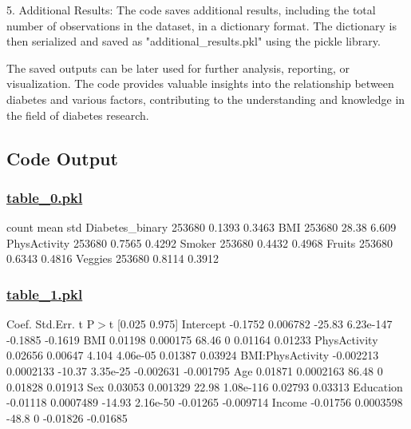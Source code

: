 \documentclass[11pt]{article}
\begin{document}
5. Additional Results: The code saves additional results, including the total number of observations in the dataset, in a dictionary format. The dictionary is then serialized and saved as "additional\_results.pkl" using the pickle library.

The saved outputs can be later used for further analysis, reporting, or visualization. The code provides valuable insights into the relationship between diabetes and various factors, contributing to the understanding and knowledge in the field of diabetes research.

\subsection{Code Output}\hypertarget{file-table-0-pkl}{}

\subsubsection*{\hyperlink{code-Data Analysis-table-0-pkl}{table\_0.pkl}}

\begin{codeoutput}
                 count   mean    std
Diabetes\_binary 253680 0.1393 0.3463
BMI             253680  28.38  6.609
PhysActivity    253680 0.7565 0.4292
Smoker          253680 0.4432 0.4968
Fruits          253680 0.6343 0.4816
Veggies         253680 0.8114 0.3912
\end{codeoutput}\hypertarget{file-table-1-pkl}{}

\subsubsection*{\hyperlink{code-Data Analysis-table-1-pkl}{table\_1.pkl}}

\begin{codeoutput}
                     Coef.  Std.Err.      t      P$>$\textbar{}t\textbar{}    [0.025    0.975]
Intercept          -0.1752  0.006782 -25.83  6.23e-147   -0.1885   -0.1619
BMI                0.01198  0.000175  68.46          0   0.01164   0.01233
PhysActivity       0.02656   0.00647  4.104   4.06e-05   0.01387   0.03924
BMI:PhysActivity -0.002213 0.0002133 -10.37   3.35e-25 -0.002631 -0.001795
Age                0.01871 0.0002163  86.48          0   0.01828   0.01913
Sex                0.03053  0.001329  22.98  1.08e-116   0.02793   0.03313
Education         -0.01118 0.0007489 -14.93   2.16e-50  -0.01265 -0.009714
Income            -0.01756 0.0003598  -48.8          0  -0.01826  -0.01685
\end{codeoutput}\hypertarget{file-table-2-pkl}{}
\end{document}
